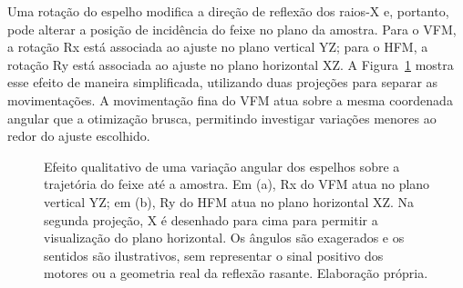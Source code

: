 \documentclass[12pt,a4paper]{article}
\begin{document}
Uma rotação do espelho modifica a direção de reflexão dos raios-X e, portanto, pode alterar a posição de incidência do feixe no plano da amostra. Para o VFM, a rotação Rx está associada ao ajuste no plano vertical YZ; para o HFM, a rotação Ry está associada ao ajuste no plano horizontal XZ. A Figura~\ref{fig:kb-rotacoes-feixe} mostra esse efeito de maneira simplificada, utilizando duas projeções para separar as movimentações. A movimentação fina do VFM atua sobre a mesma coordenada angular que a otimização brusca, permitindo investigar variações menores ao redor do ajuste escolhido.

\begin{figure}[htbp]
    \centering
    \caption{Efeito qualitativo de uma variação angular dos espelhos sobre a trajetória do feixe até a amostra. Em (a), Rx do VFM atua no plano vertical YZ; em (b), Ry do HFM atua no plano horizontal XZ. Na segunda projeção, X é desenhado para cima para permitir a visualização do plano horizontal. Os ângulos são exagerados e os sentidos são ilustrativos, sem representar o sinal positivo dos motores ou a geometria real da reflexão rasante. Elaboração própria.}
    \label{fig:kb-rotacoes-feixe}
\end{figure}
\end{document}
